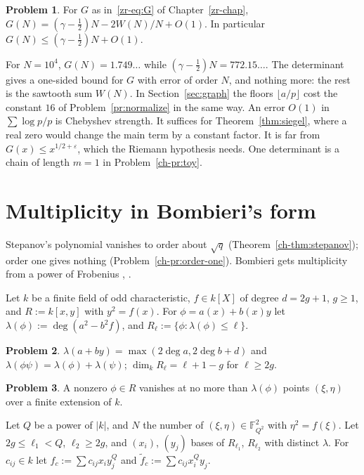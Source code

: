 \documentclass[reqno]{amsart}
\newcounter{chap}
\theoremstyle{definition}
\newtheorem{problem}{Problem}[section]
\theoremstyle{plain}
\newcommand{\F}{\mathbb{F}}
\begin{document}
\begin{problem}\label{pr:G-chebyshev}
For \(G\) as in~\eqref{zr-eq:G} of Chapter~\ref{zr-chap}, \(G(N) = (\gamma - \frac12)N - 2W(N)/N + O(1)\).  In particular \(G(N) \le (\gamma - \frac12)N + O(1)\).
\end{problem}

For \(N = 10^4\), \(G(N) = 1.749\ldots\) while \((\gamma - \frac12)N = 772.15\ldots\).  The determinant gives a one-sided bound for \(G\) with error of order \(N\), and nothing more: the rest is the sawtooth sum \(W(N)\).  In Section~\ref{sec:graph} the floors \(\lfloor a/p \rfloor\) cost the constant \(16\) of Problem~\ref{pr:normalize} in the same way.  An error \(O(1)\) in \(\sum \log p/p\) is Chebyshev strength.  It suffices for Theorem~\ref{thm:siegel}, where a real zero would change the main term by a constant factor.  It is far from \(G(x) \le x^{1/2 + \varepsilon}\), which the Riemann hypothesis needs.  One determinant is a chain of length \(m = 1\) in Problem~\ref{ch-pr:toy}.

\section{Multiplicity in Bombieri's form}\label{sec:bombieri}

Stepanov's polynomial vanishes to order about \(\sqrt q\) (Theorem~\ref{ch-thm:stepanov}); order one gives nothing (Problem~\ref{ch-pr:order-one}).  Bombieri gets multiplicity from a power of Frobenius \cite{Bom74}, \cite[App.~D]{N}.

Let \(k\) be a finite field of odd characteristic, \(f \in k[X]\) of degree \(d = 2g + 1\), \(g \ge 1\), and \(R := k[x, y]\) with \(y^2 = f(x)\).  For \(\phi = a(x) + b(x)y\) let \(\lambda(\phi) := \deg(a^2 - b^2 f)\), and \(R_\ell := \{\phi : \lambda(\phi) \le \ell\}\).

\begin{problem}\label{pr:hyp-degree}
\(\lambda(a + by) = \max(2\deg a, 2\deg b + d)\) and \(\lambda(\phi\psi) = \lambda(\phi) + \lambda(\psi)\); \(\dim_k R_\ell = \ell + 1 - g\) for \(\ell \ge 2g\).
\end{problem}

\begin{problem}\label{pr:hyp-zeros}
A nonzero \(\phi \in R\) vanishes at no more than \(\lambda(\phi)\) points \((\xi, \eta)\) over a finite extension of \(k\).
\end{problem}

Let \(Q\) be a power of \(\lvert k \rvert\), and \(N\) the number of \((\xi, \eta) \in \F_{Q^2}^2\) with \(\eta^2 = f(\xi)\).  Let \(2g \le \ell_1 < Q\), \(\ell_2 \ge 2g\), and \((x_i)\), \((y_j)\) bases of \(R_{\ell_1}\), \(R_{\ell_2}\) with distinct \(\lambda\).  For \(c_{ij} \in k\) let \(f_c := \sum c_{ij} x_i y_j^Q\) and \(\tilde f_c := \sum c_{ij} x_i^Q y_j\).
\end{document}
